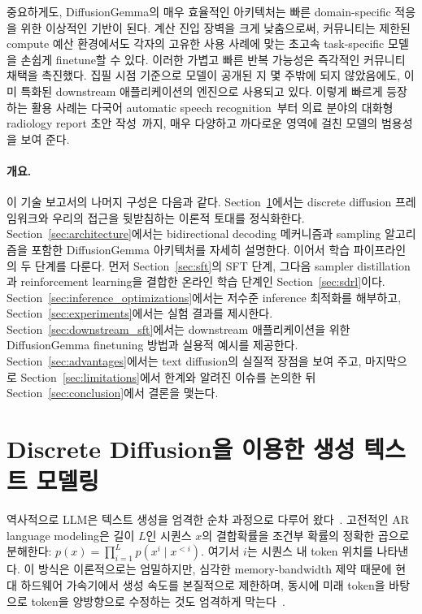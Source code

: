 \documentclass[11pt, a4paper, logo, copyright, gdm]{google}
\begin{document}
중요하게도, DiffusionGemma의 매우 효율적인 아키텍처는 빠른 domain-specific 적응을 위한 이상적인 기반이 된다. 계산 진입 장벽을 크게 낮춤으로써, 커뮤니티는 제한된 compute 예산 환경에서도 각자의 고유한 사용 사례에 맞는 초고속 task-specific 모델을 손쉽게 finetune할 수 있다. 이러한 가볍고 빠른 반복 가능성은 즉각적인 커뮤니티 채택을 촉진했다. 집필 시점 기준으로 모델이 공개된 지 몇 주밖에 되지 않았음에도, 이미 특화된 downstream 애플리케이션의 엔진으로 사용되고 있다. 이렇게 빠르게 등장하는 활용 사례는 다국어 automatic speech recognition~\citep{interfaze2026diffusion}부터 의료 분야의 대화형 radiology report 초안 작성~\citep{van2026discrete}까지, 매우 다양하고 까다로운 영역에 걸친 모델의 범용성을 보여 준다.

\paragraph{개요.}
이 기술 보고서의 나머지 구성은 다음과 같다. Section~\ref{sec:background}에서는 discrete diffusion 프레임워크와 우리의 접근을 뒷받침하는 이론적 토대를 정식화한다. Section~\ref{sec:architecture}에서는 bidirectional decoding 메커니즘과 sampling 알고리즘을 포함한 DiffusionGemma 아키텍처를 자세히 설명한다. 이어서 학습 파이프라인의 두 단계를 다룬다. 먼저 Section~\ref{sec:sft}의 SFT 단계, 그다음 sampler distillation과 reinforcement learning을 결합한 온라인 학습 단계인 Section~\ref{sec:sdrl}이다. Section~\ref{sec:inference_optimizations}에서는 저수준 inference 최적화를 해부하고, Section~\ref{sec:experiments}에서는 실험 결과를 제시한다. Section~\ref{sec:downstream_sft}에서는 downstream 애플리케이션을 위한 DiffusionGemma finetuning 방법과 실용적 예시를 제공한다. Section~\ref{sec:advantages}에서는 text diffusion의 실질적 장점을 보여 주고, 마지막으로 Section~\ref{sec:limitations}에서 한계와 알려진 이슈를 논의한 뒤 Section~\ref{sec:conclusion}에서 결론을 맺는다.



\section{Discrete Diffusion을 이용한 생성 텍스트 모델링} \label{sec:background}

역사적으로 LLM은 텍스트 생성을 엄격한 순차 과정으로 다루어 왔다~\citep{bengio2003neural, mikolov2010recurrent, graves2013generating, sutskever2014sequence, Vaswani2017, gu2018nonautoregressive}. 고전적인 AR language modeling은 길이 $L$인 시퀀스 $x$의 결합확률을 조건부 확률의 정확한 곱으로 분해한다: $p(x) = \prod_{i=1}^L p(x^i \mid x^{<i})$. 여기서 $i$는 시퀀스 내 token 위치를 나타낸다. 이 방식은 이론적으로는 엄밀하지만, 심각한 memory-bandwidth 제약 때문에 현대 하드웨어 가속기에서 생성 속도를 본질적으로 제한하며, 동시에 미래 token을 바탕으로 token을 양방향으로 수정하는 것도 엄격하게 막는다~\citep{leviathan2023fast, savinov2022sundae}.
\end{document}
